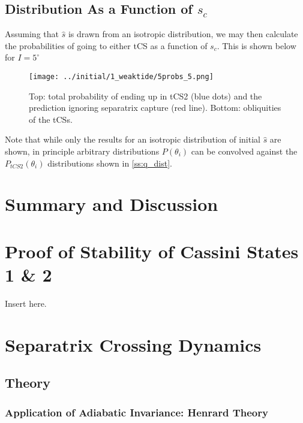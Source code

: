 \documentclass[
        fleqn,
        usenatbib,
        referee,
    ]{mnras}
\newcommand*{\p}[1]{\left(#1\right)}
\begin{document}
\subsection{Distribution As a Function of $s_c$}\label{ss:s_c_dist}

Assuming that $\hat{s}$ is drawn from an isotropic distribution, we may then
calculate the probabilities of going to either tCS as a function of $s_c$. This
is shown below for $I = 5^\circ$
\begin{figure}
    \centering
    \texttt{[image: ../initial/1\_weaktide/5probs\_5.png]}
    \caption{Top: total probability of ending up in tCS2 (blue dots) and the
    prediction ignoring separatrix capture (red line). Bottom:
    obliquities of the tCSs.}\label{fig:probs}
\end{figure}

Note that while only the results for an isotropic distribution of initial
$\hat{s}$ are shown, in principle arbitrary distributions $P\p{\theta_i}$ can be
convolved against the $P_{tCS2}\p{\theta_i}$ distributions shown in
\autoref{ss:q_dist}.

\section{Summary and Discussion}\label{s:summary}




\appendix
\section{Proof of Stability of Cassini States 1 \& 2}\label{app:cs_stab}

Insert here.

\section{Separatrix Crossing Dynamics}

\subsection{Theory}\label{app:sep_crossing_dynamics}

\subsubsection{Application of Adiabatic Invariance: Henrard Theory}
\end{document}
